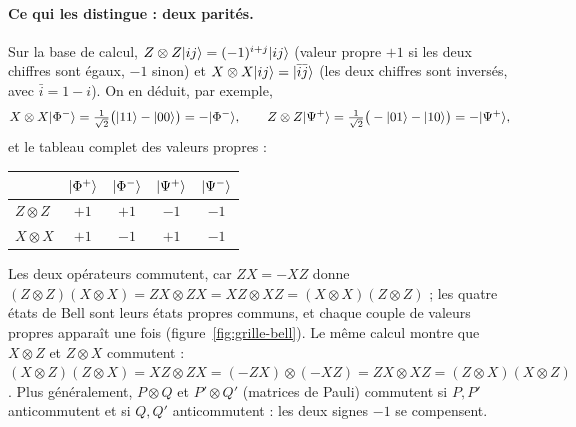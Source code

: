 \paragraph{Ce qui les distingue : deux parités.} Sur la base de calcul,
$Z\otimes Z|ij\rangle=(-1)^{i+j}|ij\rangle$ (valeur propre $+1$ si les deux chiffres sont égaux, $-1$
sinon) et $X\otimes X|ij\rangle=|\bar i\bar j\rangle$ (les deux chiffres sont inversés, avec
$\bar i=1-i$). On en déduit, par exemple,
\[
  X\otimes X|\Phi^-\rangle=\tfrac{1}{\sqrt2}\big(|11\rangle-|00\rangle\big)=-|\Phi^-\rangle,
  \qquad
  Z\otimes Z|\Psi^+\rangle=\tfrac{1}{\sqrt2}\big(-|01\rangle-|10\rangle\big)=-|\Psi^+\rangle,
\]
et le tableau complet des valeurs propres :
\begin{center}
\renewcommand{\arraystretch}{1.3}
\begin{tabular}{@{}lcccc@{}}
\toprule
 & $|\Phi^+\rangle$ & $|\Phi^-\rangle$ & $|\Psi^+\rangle$ & $|\Psi^-\rangle$ \\
\midrule
$Z\otimes Z$ & $+1$ & $+1$ & $-1$ & $-1$ \\
$X\otimes X$ & $+1$ & $-1$ & $+1$ & $-1$ \\
\bottomrule
\end{tabular}
\end{center}
Les deux opérateurs commutent, car $ZX=-XZ$ donne
$(Z\otimes Z)(X\otimes X)=ZX\otimes ZX=XZ\otimes XZ=(X\otimes X)(Z\otimes Z)$ ; les quatre états de
Bell sont leurs états propres communs, et chaque couple de valeurs propres apparaît une fois
(figure~\ref{fig:grille-bell}). Le même calcul montre que $X\otimes Z$ et $Z\otimes X$
commutent : $(X\otimes Z)(Z\otimes X)=XZ\otimes ZX=(-ZX)\otimes(-XZ)=ZX\otimes XZ=(Z\otimes X)(X\otimes Z)$.
Plus généralement, $P\otimes Q$ et $P'\otimes Q'$ (matrices de Pauli) commutent si $P,P'$
anticommutent et si $Q,Q'$ anticommutent : les deux signes $-1$ se compensent.

